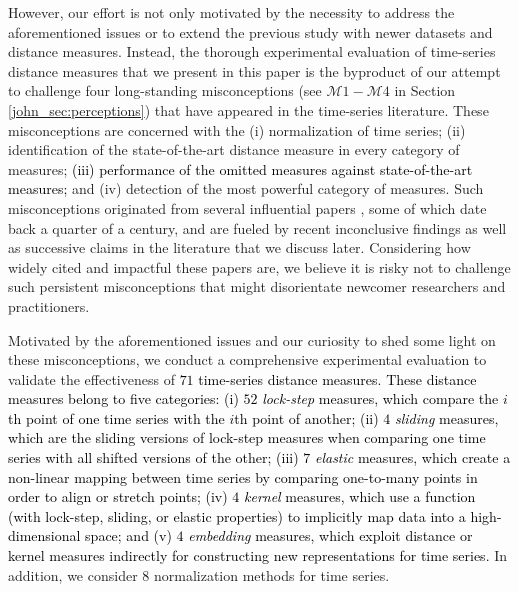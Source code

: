 \documentclass[11pt]{article}
\begin{document}
However, our effort is not only motivated by the necessity to address the aforementioned issues or to extend the previous study with newer datasets and distance measures. Instead, the thorough experimental evaluation of time-series distance measures that we present in this paper is the byproduct of our attempt to challenge four long-standing misconceptions (see $\mathcal{M}1-\mathcal{M}4$ in Section \ref{john_sec:perceptions}) that have appeared in the time-series literature. These misconceptions are concerned with the (i) normalization of time series; (ii) identification of the state-of-the-art distance measure in every category of measures; \textcolor{black}{(iii) performance of the omitted measures against state-of-the-art measures;} and (iv) detection of the most powerful category of measures. Such misconceptions originated from several influential papers \cite{agrawal1993,Faloutsos1994fast,goldin1995similarity,berndt1994using,shieh2008sax}, some of which date back a quarter of a century, and are fueled by recent inconclusive findings \cite{ding2008querying} as well as successive claims in the literature that we discuss later. Considering how widely cited and impactful these papers are, we believe it is risky not to challenge such persistent misconceptions that might disorientate newcomer researchers and practitioners. 

Motivated by the aforementioned issues and our curiosity to shed some light on these misconceptions, we conduct a comprehensive experimental evaluation to validate the effectiveness of \textcolor{black}{ $71$ time-series distance measures. These distance measures belong to five categories: (i) $52$ {\em lock-step} measures, which compare the $i$th point of one time series with the $i$th point of another; (ii) $4$ {\em sliding} measures, which are the sliding versions of lock-step measures when comparing one time series with all shifted versions of the other; (iii) $7$ {\em elastic} measures, which create a non-linear mapping between time series by comparing one-to-many points in order to align or stretch points; (iv) $4$ {\em kernel} measures, which use a function (with lock-step, sliding, or elastic properties) to implicitly map data into a high-dimensional space; and (v) $4$ {\em embedding} measures, which exploit distance or kernel measures indirectly for constructing new representations for time series.} In addition, we consider $8$ normalization methods for time series. %
\end{document}
